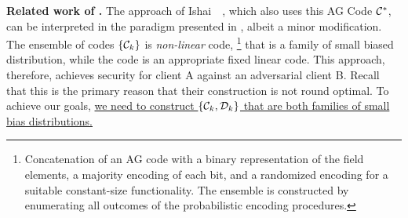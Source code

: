 \noindent\textbf{Related work of \cite{FOCS:IKOS09}.} 
The approach of Ishai~\etal~\cite{FOCS:IKOS09}, which also uses this AG Code ${\mathcal C}^*$, can be interpreted in the paradigm presented in , albeit a minor modification. 
The ensemble of codes $\{{\mathcal C}_k\}$ is {\em non-linear} code,%
\footnote{
	Concatenation of an AG code with a binary representation of the field elements, a majority encoding of each bit, and a randomized encoding for a suitable constant-size functionality. 
	The ensemble is constructed by enumerating all outcomes of the probabilistic encoding procedures.  
}
that is a family of small biased distribution, while the code \cD is an appropriate fixed linear code. 
This approach, therefore, achieves security for client A against an adversarial client B. 
Recall that this is the primary reason that their construction is not round optimal. 
To achieve our goals, \ul{we need to construct $\{{\mathcal C}_k, {\mathcal D}_k\}$ that are both families of small bias distributions.}  